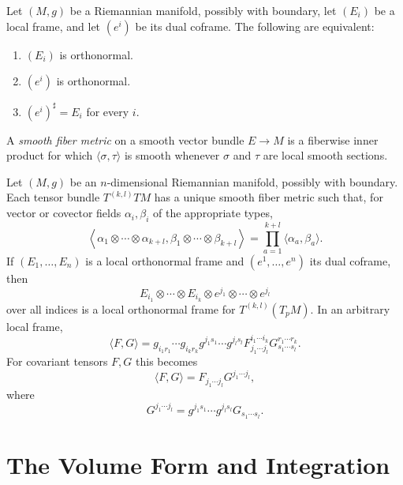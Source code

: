 \begin{proposition}
\label{prop:orthonormal-frames-and-coframes}


Let $(M,g)$ be a Riemannian manifold, possibly with boundary, let $(E_i)$ be a
local frame, and let $(e^i)$ be its dual coframe. The following are
equivalent:
\begin{enumerate}
\item[(a)] $(E_i)$ is orthonormal.
\item[(b)] $(e^i)$ is orthonormal.
\item[(c)] $(e^i)^\sharp=E_i$ for every $i$.
\end{enumerate}
\end{proposition}

A \emph{smooth fiber metric} on a smooth vector bundle $E\to M$ is a fiberwise
inner product for which $\langle\sigma,\tau\rangle$ is smooth whenever $\sigma$ and
$\tau$ are local smooth sections.

\begin{proposition}
\label{prop:inner-products-of-tensors}
Let $(M,g)$ be an $n$-dimensional Riemannian manifold, possibly with boundary.
Each tensor bundle $T^{(k,l)}TM$ has a unique smooth fiber metric such that, for
vector or covector fields $\alpha_i,\beta_i$ of the appropriate types,
\begin{equation}
\left\langle\alpha_1\otimes\cdots\otimes\alpha_{k+l},
\beta_1\otimes\cdots\otimes\beta_{k+l}\right\rangle
=\prod_{a=1}^{k+l}\langle\alpha_a,\beta_a\rangle. \tag{2.15}
\end{equation}
If $(E_1,\ldots,E_n)$ is a local orthonormal frame and
$(e^1,\ldots,e^n)$ its dual coframe, then
\[
E_{i_1}\otimes\cdots\otimes E_{i_k}\otimes
e^{j_1}\otimes\cdots\otimes e^{j_l}
\]
over all indices is a local orthonormal frame for $T^{(k,l)}(T_pM)$. In an
arbitrary local frame,
\begin{equation}
\langle F,G\rangle
=g_{i_1r_1}\cdots g_{i_kr_k}g^{j_1s_1}\cdots g^{j_ls_l}
F_{j_1\cdots j_l}^{i_1\cdots i_k}
G_{s_1\cdots s_l}^{r_1\cdots r_k}. \tag{2.16}
\end{equation}
For covariant tensors $F,G$ this becomes
\[
\langle F,G\rangle=F_{j_1\cdots j_l}G^{j_1\cdots j_l},
\]
where
\[
G^{j_1\cdots j_l}
=g^{j_1s_1}\cdots g^{j_ls_l}G_{s_1\cdots s_l}.
\]
\end{proposition}
\section{The Volume Form and Integration}

